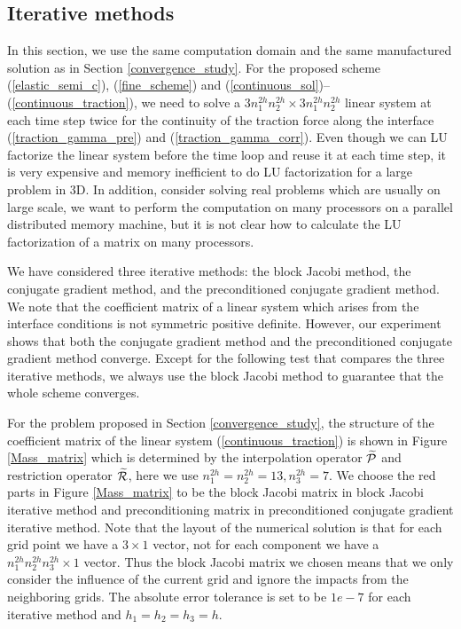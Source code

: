 \subsection{Iterative methods}\label{iterative_section}
In this section, we use the same computation domain and the same manufactured solution as in Section \ref{convergence_study}. For the proposed scheme (\ref{elastic_semi_c}), (\ref{fine_scheme}) and (\ref{continuous_sol})--(\ref{continuous_traction}), we need to solve a $3n_1^{2h}n_2^{2h}\times 3n_1^{2h}n_2^{2h}$ linear system at each time step twice for the continuity of the traction force along the interface (\ref{traction_gamma_pre}) and (\ref{traction_gamma_corr}). Even though we can LU factorize the linear system before the time loop and reuse it at each time step, it is very expensive and memory inefficient to do LU factorization for a large problem in $3$D. In addition, consider solving real problems which are usually on large scale, we want to perform the computation on many processors on a parallel distributed memory machine, but it is not clear how to calculate the LU factorization of a matrix on many processors.

We have considered three iterative methods: the block Jacobi method, the conjugate gradient method, and the preconditioned conjugate gradient method. We note that the coefficient matrix of a linear system which arises from the interface conditions is not symmetric positive definite. However, our experiment shows that both the conjugate gradient method and the preconditioned conjugate gradient method converge. Except for the following test that compares the three iterative methods, we always use the block Jacobi method to guarantee that the whole scheme converges. 

For the problem proposed in Section \ref{convergence_study}, the structure of the coefficient matrix of the linear system (\ref{continuous_traction}) is shown in Figure \ref{Mass_matrix} which is determined by the interpolation operator $\widetilde{\mathcal{P}}$ and restriction operator $\widetilde{\mathcal{R}}$, here we use $n_1^{2h} = n_2^{2h}=13, n_3^{2h} = 7$. We choose the red parts in Figure \ref{Mass_matrix} to be the block Jacobi matrix in block Jacobi iterative method and preconditioning matrix in preconditioned conjugate gradient iterative method. Note that the layout of the numerical solution is that for each grid point we have a $3\times1$ vector, not for each component we have a $n_1^{2h}n_2^{2h}n_3^{2h}\times1$ vector.  Thus the block Jacobi matrix we chosen means that we only consider the influence of the current grid and ignore the impacts from the neighboring grids. The absolute error tolerance is set to be $1e-7$ for each iterative method and $h_1 = h_2 = h_3 = h$.


